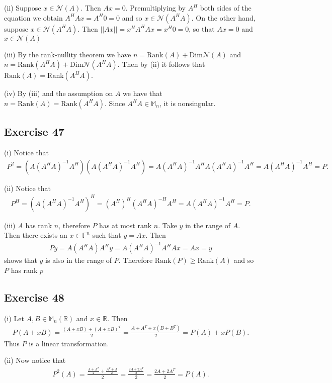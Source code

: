 \documentclass[11.5pt, letterpaper, bibtotoc,
    tablecaptionabove, figurecaptionabove]{article}
\begin{document}
(ii)
Suppose $x\in\mathcal N(A)$.
Then $Ax=0$.
Premultiplying by $A^H$ both sides of the equation we obtain $A^HAx=A^H0=0$
and so $x\in\mathcal N(A^HA)$.
On the other hand, suppose $x\in\mathcal N(A^HA)$.
Then $||Ax||=x^HA^HAx=x^H0=0$, so that $Ax=0$ and $x\in\mathcal N(A)$

(iii)
By the rank-nullity theorem we have $n=\text{Rank}(A)+\text{Dim}\mathcal N(A)$
and $n=\text{Rank}(A^HA)+\text{Dim}\mathcal N(A^HA)$.
Then by (ii) it follows that $\text{Rank}(A)=\text{Rank}(A^HA)$.

(iv)
By (iii) and the assumption on $A$ we have that $n=\text{Rank}(A)=\text{Rank}(A^HA)$.
Since $A^HA\in\mathbb M_n$, it is nonsingular.

\subsection*{Exercise 47}
(i)
Notice that
\begin{align*}
    P^2=(A(A^HA)^{-1}A^H)(A(A^HA)^{-1}A^H)=
    A(A^HA)^{-1}A^HA(A^HA)^{-1}A^H=
    A(A^HA)^{-1}A^H=P.
\end{align*}

(ii)
Notice that
\begin{align*}
    P^H=(A(A^HA)^{-1}A^H)^H=
    (A^H)^H(A^HA)^{-H}A^H=A(A^HA)^{-1}A^H=P.
\end{align*}

(iii)
$A$ has rank $n$, therefore $P$ has at most rank $n$.
Take $y$ in the range of $A$.
Then there exists an $x\in\mathbb F^n$ such that $y=Ax$.
Then
\begin{align*}
    Py=A(A^HA)A^Hy=A(A^HA)^{-1}A^HAx=Ax=y
\end{align*}
shows that $y$ is also in the range of $P$.
Therefore $\text{Rank}(P)\geq\text{Rank}(A)$ and so $P$ has rank $p$

\subsection*{Exercise 48}
(i)
Let $A,B\in\mathbb M_n(\mathbb R)$ and $x\in\mathbb R$.
Then
\begin{align*}
    P(A+xB)=\frac{(A+xB)+(A+xB)^T}{2}=
    \frac{A+A^T+x(B+B^T)}{2}=P(A)+xP(B).
\end{align*}
Thus $P$ is a linear transformation.

(ii)
Now notice that
\begin{align*}
    P^2(A)=\frac{\frac{A+A^T}{2}+\frac{A^T+A}{2}}{2}=
    \frac{\frac{2A+2A^T}{2}}{2}=\frac{2A+2A^T}{2}=P(A).
\end{align*}
\end{document}
